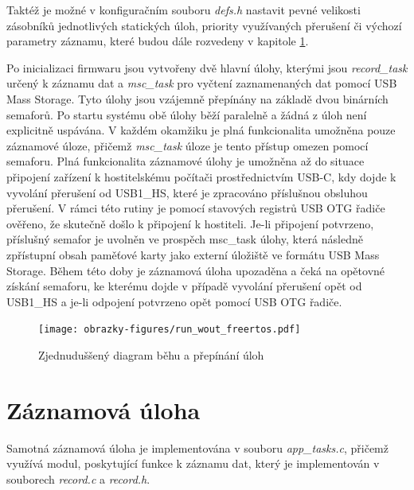 Taktéž je možné v konfiguračním souboru \textit{defs.h} nastavit pevné velikosti zásobníků jednotlivých statických úloh, priority využívaných přerušení či výchozí parametry záznamu, které budou dále rozvedeny v kapitole \ref{zaznamove_vlakno}. 

Po inicializaci firmwaru jsou vytvořeny dvě hlavní úlohy, kterými jsou \textit{record\_task} určený k záznamu dat a \textit{msc\_task} pro vyčtení zaznamenaných dat pomocí USB Mass Storage. Tyto úlohy jsou vzájemně přepínány na základě dvou binárních semaforů. Po startu systému obě úlohy běží paralelně a žádná z úloh není explicitně uspávána. V každém okamžiku je plná funkcionalita umožněna pouze záznamové úloze, přičemž \textit{msc\_task} úloze je tento přístup omezen pomocí semaforu. Plná funkcionalita záznamové úlohy je umožněna až do situace připojení zařízení k hostitelskému počítači prostřednictvím USB-C, kdy dojde k vyvolání přerušení od USB1\_HS, které je zpracováno příslušnou obsluhou přerušení. V rámci této rutiny je pomocí stavových registrů USB OTG řadiče ověřeno, že skutečně došlo k připojení k hostiteli. Je-li připojení potvrzeno, příslušný semafor je uvolněn ve prospěch msc\_task úlohy, která následně zpřístupní obsah paměťové karty jako externí úložiště ve formátu USB Mass Storage. Během této doby je záznamová úloha upozaděna a čeká na opětovné získání semaforu, ke kterému dojde v případě vyvolání přerušení opět od USB1\_HS a je-li odpojení potvrzeno opět pomocí USB OTG řadiče. 

\begin{figure}[h]
    \centering
    \texttt{[image: obrazky-figures/run\_wout\_freertos.pdf]}
    
    \caption{Zjednuduššený diagram běhu a přepínání úloh}
    \label{fig:run-wout-freertos}
\end{figure}

\newpage

\section{Záznamová úloha}
\label{zaznamove_vlakno}
Samotná záznamová úloha je implementována v souboru \textit{app\_tasks.c}, přičemž využívá modul, poskytující funkce k záznamu dat, který je implementován v souborech \textit{record.c} a \textit{record.h}. 

